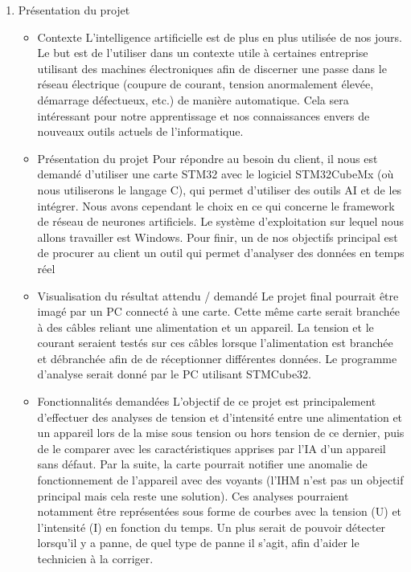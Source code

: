 \documentclass[11pt]{report}
\begin{document}
\begin{enumerate}
	\item \LARGE Présentation du projet
	\begin{itemize} \large
	    \item \large Contexte 
	    \newline L'intelligence artificielle est de plus en plus utilisée de nos jours. Le but est de l'utiliser dans un contexte utile à certaines entreprise utilisant des machines électroniques afin de discerner une passe dans le réseau électrique (coupure de courant, tension anormalement élevée, démarrage défectueux, etc.) de manière automatique. Cela sera intéressant pour notre apprentissage et nos connaissances envers de nouveaux outils actuels de l'informatique.
	    
	    \item Présentation du projet
	    \newline Pour répondre au besoin du client, il nous est demandé d'utiliser une carte STM32 avec le logiciel STM32CubeMx (où nous utiliserons le langage C), qui permet d'utiliser des outils AI et de les intégrer. Nous avons cependant le choix en ce qui concerne le framework de réseau de neurones artificiels. Le système d'exploitation sur lequel nous allons travailler est Windows. Pour finir, un de nos objectifs principal est de procurer au client un outil qui permet d'analyser des données en temps réel
	    
	    \item Visualisation du résultat attendu / demandé
	    \newline Le projet final pourrait être imagé par un PC connecté à une carte. Cette même carte serait branchée à des câbles reliant une alimentation et un appareil. La tension et le courant seraient testés sur ces câbles lorsque l'alimentation est branchée et débranchée afin de de réceptionner différentes données. Le programme d'analyse serait donné par le PC utilisant STMCube32.
	    
	    \item Fonctionnalités demandées
	    \newline L'objectif de ce projet est principalement d'effectuer des analyses de tension et d'intensité entre une alimentation et un appareil lors de la mise sous tension ou hors tension de ce dernier, puis de le comparer avec les caractéristiques apprises par l'IA d'un appareil sans défaut. Par la suite, la carte pourrait notifier une anomalie de fonctionnement de l'appareil avec des voyants (l'IHM n'est pas un objectif principal mais cela reste une solution). Ces analyses pourraient notamment être représentées sous forme de courbes avec la tension (U) et l'intensité (I) en fonction du temps. 
	    \newline Un plus serait de pouvoir détecter lorsqu'il y a panne, de quel type de panne il s'agit, afin d'aider le technicien à la corriger.
	\end{itemize}
	

\end{enumerate}
\end{document}
